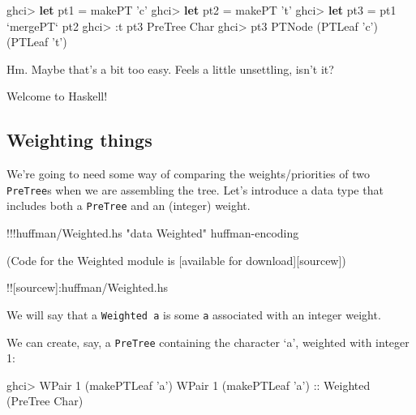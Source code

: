 \documentclass[]{article}
\newenvironment{Shaded}{}{}
\newcommand{\KeywordTok}[1]{\textcolor[rgb]{0.00,0.44,0.13}{\textbf{{#1}}}}
\newcommand{\DataTypeTok}[1]{\textcolor[rgb]{0.56,0.13,0.00}{{#1}}}
\newcommand{\DecValTok}[1]{\textcolor[rgb]{0.25,0.63,0.44}{{#1}}}
\newcommand{\CharTok}[1]{\textcolor[rgb]{0.25,0.44,0.63}{{#1}}}
\newcommand{\StringTok}[1]{\textcolor[rgb]{0.25,0.44,0.63}{{#1}}}
\newcommand{\OtherTok}[1]{\textcolor[rgb]{0.00,0.44,0.13}{{#1}}}
\newcommand{\FunctionTok}[1]{\textcolor[rgb]{0.02,0.16,0.49}{{#1}}}
\newcommand{\NormalTok}[1]{{#1}}
\begin{document}
\begin{Shaded}
\begin{Highlighting}[]
\NormalTok{ghci}\FunctionTok{>} \KeywordTok{let} \NormalTok{pt1 }\FunctionTok{=} \NormalTok{makePT }\CharTok{'c'}
\NormalTok{ghci}\FunctionTok{>} \KeywordTok{let} \NormalTok{pt2 }\FunctionTok{=} \NormalTok{makePT }\CharTok{'t'}
\NormalTok{ghci}\FunctionTok{>} \KeywordTok{let} \NormalTok{pt3 }\FunctionTok{=} \NormalTok{pt1 }\OtherTok{`mergePT`} \NormalTok{pt2}
\NormalTok{ghci}\FunctionTok{>} \FunctionTok{:}\NormalTok{t pt3}
\DataTypeTok{PreTree} \DataTypeTok{Char}
\NormalTok{ghci}\FunctionTok{>} \NormalTok{pt3}
\DataTypeTok{PTNode} \NormalTok{(}\DataTypeTok{PTLeaf} \CharTok{'c'}\NormalTok{) (}\DataTypeTok{PTLeaf} \CharTok{'t'}\NormalTok{)}
\end{Highlighting}
\end{Shaded}

Hm. Maybe that's a bit too easy. Feels a little unsettling, isn't it?

Welcome to Haskell!

\subsection{Weighting things}\label{weighting-things}

We're going to need some way of comparing the weights/priorities of two
\texttt{PreTree}s when we are assembling the tree. Let's introduce a
data type that includes both a \texttt{PreTree} and an (integer) weight.

\begin{Shaded}
\begin{Highlighting}[]
\FunctionTok{!!!}\NormalTok{huffman}\FunctionTok{/}\NormalTok{Weighted.hs }\StringTok{"data Weighted"} \NormalTok{huffman}\FunctionTok{-}\NormalTok{encoding}
\end{Highlighting}
\end{Shaded}

(Code for the Weighted module is {[}available for
download{]}{[}sourcew{]})

!!{[}sourcew{]}:huffman/Weighted.hs

We will say that a \texttt{Weighted\ a} is some \texttt{a} associated
with an integer weight.

We can create, say, a \texttt{PreTree} containing the character `a',
weighted with integer 1:

\begin{Shaded}
\begin{Highlighting}[]
\NormalTok{ghci}\FunctionTok{>} \DataTypeTok{WPair} \DecValTok{1} \NormalTok{(makePTLeaf }\CharTok{'a'}\NormalTok{)}
\DataTypeTok{WPair} \DecValTok{1} \NormalTok{(makePTLeaf }\CharTok{'a'}\NormalTok{)}\OtherTok{ ::} \DataTypeTok{Weighted} \NormalTok{(}\DataTypeTok{PreTree} \DataTypeTok{Char}\NormalTok{)}
\end{Highlighting}
\end{Shaded}
\end{document}
